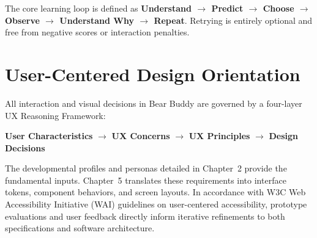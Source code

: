 The core learning loop is defined as \textbf{Understand $\rightarrow$ Predict $\rightarrow$ Choose $\rightarrow$ Observe $\rightarrow$ Understand Why $\rightarrow$ Repeat}. Retrying is entirely optional and free from negative scores or interaction penalties.

\section{User-Centered Design Orientation}

All interaction and visual decisions in Bear Buddy are governed by a four-layer UX Reasoning Framework:
\begin{center}
\textbf{User Characteristics} $\longrightarrow$ \textbf{UX Concerns} $\longrightarrow$ \textbf{UX Principles} $\longrightarrow$ \textbf{Design Decisions}
\end{center}

The developmental profiles and personas detailed in Chapter~2 provide the fundamental inputs. Chapter~5 translates these requirements into interface tokens, component behaviors, and screen layouts. In accordance with W3C Web Accessibility Initiative (WAI) guidelines on user-centered accessibility, prototype evaluations and user feedback directly inform iterative refinements to both specifications and software architecture.
